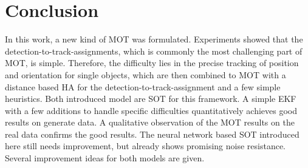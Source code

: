 \documentclass{article}
\begin{document}

\section{Conclusion}

In this work, a new kind of MOT was formulated. Experiments showed that the detection-to-track-assignments, which is commonly the most challenging part of MOT, is simple. Therefore, the difficulty lies in the precise tracking of position and orientation for single objects, which are then combined to MOT with a distance based HA for the detection-to-track-assignment and a few simple heuristics. Both introduced model are SOT for this framework. A simple EKF with a few additions to handle specific difficulties quantitatively achieves good results on generate data. A qualitative observation of the MOT results on the real data confirms the good results. The neural network based SOT introduced here still needs improvement, but already shows promising noise resistance. Several improvement ideas for both models are given.

  


%


\end{document}
